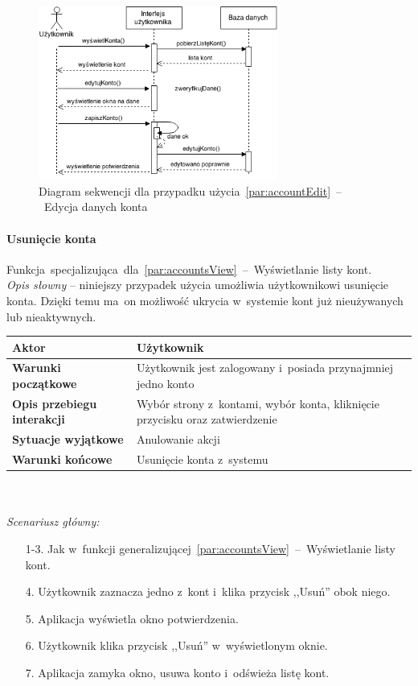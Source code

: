 \begin{figure}[H]
  \centering
  \includegraphics[width=0.7\textwidth]{images/sequence-diagram-account-edit.png}
  \caption{Diagram sekwencji dla przypadku użycia~\ref{par:accountEdit}~--~Edycja danych konta}
\end{figure}

\paragraph{Usunięcie konta\newline}
\label{par:accountDelete}
Funkcja~specjalizująca~dla~\ref{par:accountsView}~--~Wyświetlanie listy kont.\\

\textit{Opis słowny} -- niniejszy przypadek użycia umożliwia użytkownikowi usunięcie konta. Dzięki temu ma~on możliwość ukrycia w~systemie kont już nieużywanych lub nieaktywnych.\\

\begin{tabular}{|l|p{9cm}|}
  \hline \textbf{Aktor} & Użytkownik \\ \hline
  \textbf{Warunki początkowe} & Użytkownik jest zalogowany i~posiada przynajmniej jedno konto \\ \hline
  \textbf{Opis przebiegu interakcji} & Wybór strony z~kontami, wybór konta, kliknięcie przycisku oraz zatwierdzenie \\ \hline
  \textbf{Sytuacje wyjątkowe} & Anulowanie akcji \\ \hline
  \textbf{Warunki końcowe} & Usunięcie konta z~systemu \\ \hline
\end{tabular}\\\\

\noindent \textit{Scenariusz główny:}
\begin{enumerate}
  \item[1-3.] Jak w~funkcji generalizującej~\ref{par:accountsView}~--~Wyświetlanie listy kont.
  \item[4.] Użytkownik zaznacza jedno z~kont i~klika przycisk ,,Usuń'' obok niego.
  \item[5.] Aplikacja wyświetla okno potwierdzenia.
  \item[6.] Użytkownik klika przycisk ,,Usuń'' w~wyświetlonym oknie.
  \item[7.] Aplikacja zamyka okno, usuwa konto i~odświeża listę kont.
\end{enumerate}

